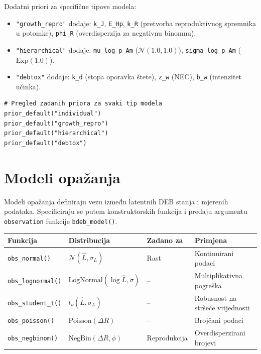 \documentclass[11pt,a4paper]{article}
\newcommand{\fn}[1]{\texttt{#1()}}
\newcommand{\code}[1]{\texttt{#1}}
\begin{document}
Dodatni priori za specifične tipove modela:
\begin{itemize}[nosep]
  \item \code{"growth\_repro"} dodaje: \code{k\_J}, \code{E\_Hp},
    \code{k\_R} (pretvorba reproduktivnog spremnika u potomke),
    \code{phi\_R} (overdisperzija za negativnu binomnu).
  \item \code{"hierarchical"} dodaje: \code{mu\_log\_p\_Am}
    ($\mathcal{N}(1.0, 1.0)$), \code{sigma\_log\_p\_Am}
    ($\text{Exp}(1.0)$).
  \item \code{"debtox"} dodaje: \code{k\_d} (stopa oporavka štete),
    \code{z\_w} (NEC), \code{b\_w} (intenzitet učinka).
\end{itemize}

\begin{lstlisting}
# Pregled zadanih priora za svaki tip modela
prior_default("individual")
prior_default("growth_repro")
prior_default("hierarchical")
prior_default("debtox")
\end{lstlisting}


\section{Modeli opažanja}
\label{sec:modeli-opazanja}

Modeli opažanja definiraju vezu između latentnih DEB stanja i mjerenih
podataka.  Specificiraju se putem konstruktorskih funkcija i predaju
argumentu \code{observation} funkcije \fn{bdeb\_model}.

\begin{longtable}{llll}
\toprule
\textbf{Funkcija} & \textbf{Distribucija} & \textbf{Zadano za} & \textbf{Primjena} \\
\midrule
\endhead
\fn{obs\_normal}    & $\mathcal{N}(\hat{L}, \sigma_L)$ & Rast & Kontinuirani podaci \\
\fn{obs\_lognormal} & $\text{LogNormal}(\log\hat{L}, \sigma)$ & -- & Multiplikativna pogreška \\
\fn{obs\_student\_t} & $t_\nu(\hat{L}, \sigma_L)$ & -- & Robusnost na stršeće vrijednosti \\
\fn{obs\_poisson}   & $\text{Poisson}(\Delta R)$ & -- & Brojčani podaci \\
\fn{obs\_negbinom}  & $\text{NegBin}(\Delta R, \phi)$ & Reprodukcija & Overdisperzirani brojevi \\
\bottomrule
\end{longtable}
\end{document}
